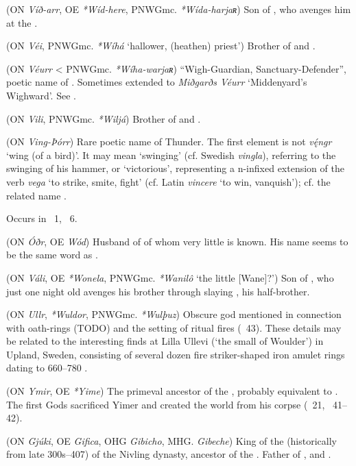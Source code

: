 \begin{itemize}
 (ON \emph{Víð-arr}, OE \emph{*Wíd-here}, PNWGmc. \emph{*Wída-harjaʀ})
  Son of , who avenges him at the .

 (ON \emph{Véi}, PNWGmc. \emph{*Wíhá} ‘hallower, (heathen) priest’)
  Brother of  and .

 (ON \emph{Véurr} < PNWGmc. \emph{*Wíha-warjaʀ})
  “Wigh-Guardian, Sanctuary-Defender”, poetic name of .  Sometimes extended to \emph{Miðgarðs Véurr} ‘Middenyard’s Wighward’.  See .

 (ON \emph{Vili}, PNWGmc. \emph{*Wiljá})
  Brother of  and .

 (ON \emph{Ving-Þórr})
  Rare poetic name of Thunder.  The first element is not \emph{vę́ngr} ‘wing (of a bird)’.  It may mean ‘swinging’ (cf. Swedish \emph{vingla}), referring to the swinging of his hammer, or ‘victorious’, representing a n-infixed extension of the verb \emph{vega} ‘to strike, smite, fight’ (cf. Latin \emph{vincere} ‘to win, vanquish’); cf. the related name .

  Occurs in \Thrymskvida\ 1, \Allvismal\ 6.

 (ON \emph{Óðr}, OE \emph{Wód})
  Husband of  of whom very little is known.  His name seems to be the same word as .

 (ON \emph{Váli}, OE \emph{*Wonela}, PNWGmc. \emph{*Wanilô} ‘the little [Wane]?’)
  Son of , who just one night old avenges his brother  through slaying , his half-brother.

 (ON \emph{Ullr}, \emph{*Wuldor}, PNWGmc. \emph{*Wulþuz})
  Obscure god mentioned in connection with oath-rings (TODO) and the setting of ritual fires (\Grimnismal\ 43). These details may be related to the interesting finds at Lilla Ullevi (‘the small  of Woulder’) in Upland, Sweden, consisting of several dozen fire striker-shaped iron amulet rings dating to 660–780 \textcite{afEdholm2009}.

 (ON \emph{Ymir}, OE \emph{*Yime})
  The primeval ancestor of the , probably equivalent to .  The first Gods sacrificed Yimer and created the world from his corpse (\Vafthrudnismal\ 21, \Grimnismal\ 41–42).

 (ON \emph{Gjúki}, OE \emph{Gifica}, OHG \emph{Gibicho}, MHG. \emph{Gibeche})
  King of the  (historically from late 300s–407) of the Nivling dynasty, ancestor of the . Father of ,  and .
\end{itemize}

